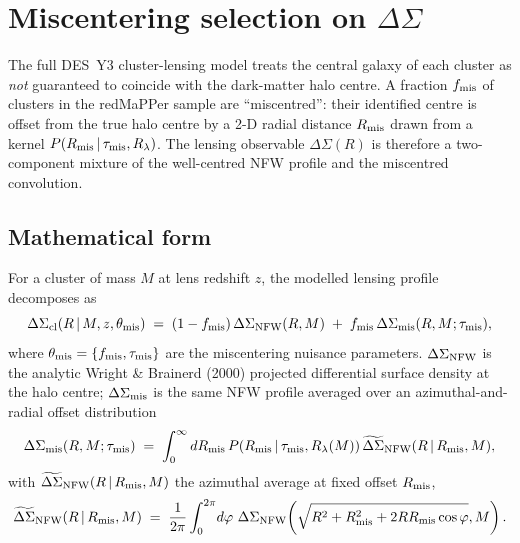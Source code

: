 \documentclass[a4paper, 11pt]{article}
\begin{document}
\section{Miscentering selection on $\Delta\Sigma$}
\label{sec:miscentering_selection}

The full DES~Y3 cluster-lensing model treats the central galaxy of each
cluster as \emph{not} guaranteed to coincide with the dark-matter halo
centre.  A fraction $f_{\rm mis}$ of clusters in the redMaPPer sample are
``miscentred'': their identified centre is offset from the true halo
centre by a 2-D radial distance $R_{\rm mis}$ drawn from a kernel
$P(R_{\rm mis} \,|\, \tau_{\rm mis}, R_\lambda)$.  The lensing observable
$\Delta\Sigma(R)$ is therefore a two-component mixture of the
well-centred NFW profile and the miscentred convolution.

\subsection{Mathematical form}

For a cluster of mass $M$ at lens redshift $z$, the modelled lensing
profile decomposes as
\begin{equation}
\label{eq:dsigma_cl}
  \Delta\Sigma_{\rm cl}(R \,|\, M, z, \theta_{\rm mis})
  \;=\; (1 - f_{\rm mis})\, \Delta\Sigma_{\rm NFW}(R, M)
       \;+\; f_{\rm mis}\, \Delta\Sigma_{\rm mis}(R, M; \tau_{\rm mis}),
\end{equation}
where $\theta_{\rm mis} = \{f_{\rm mis}, \tau_{\rm mis}\}$ are the
miscentering nuisance parameters.  $\Delta\Sigma_{\rm NFW}$ is the
analytic Wright \& Brainerd (2000) projected differential surface
density at the halo centre; $\Delta\Sigma_{\rm mis}$ is the same NFW
profile averaged over an azimuthal-and-radial offset distribution
\begin{equation}
\label{eq:dsigma_mis_avg}
  \Delta\Sigma_{\rm mis}(R, M; \tau_{\rm mis})
  \;=\; \int_0^\infty dR_{\rm mis}\,
        P(R_{\rm mis} \,|\, \tau_{\rm mis}, R_\lambda(M))\,
        \widetilde{\Delta\Sigma}_{\rm NFW}(R \,|\, R_{\rm mis}, M),
\end{equation}
with $\widetilde{\Delta\Sigma}_{\rm NFW}(R \,|\, R_{\rm mis}, M)$ the
azimuthal average at fixed offset $R_{\rm mis}$,
\begin{equation}
  \widetilde{\Delta\Sigma}_{\rm NFW}(R \,|\, R_{\rm mis}, M)
  \;=\; \frac{1}{2\pi}\int_0^{2\pi}\! d\varphi\
        \Delta\Sigma_{\rm NFW}\!\left(\sqrt{R^2 + R_{\rm mis}^2 + 2 R R_{\rm mis}\cos\varphi}, M\right).
\end{equation}
\end{document}
